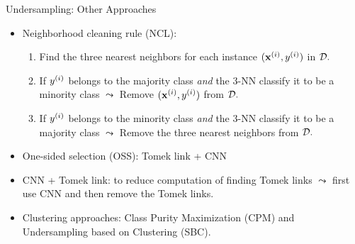 \documentclass[11pt,compress,t,notes=noshow, xcolor=table]{beamer}
\begin{document}
	\begin{frame}{Undersampling: Other Approaches}

		\footnotesize
		\begin{itemize}
	
			\item Neighborhood cleaning rule (NCL):
		
			\begin{enumerate} \footnotesize
				
				\item Find the three nearest neighbors for each instance $(\mathbf{x}^{(i)},y^{(i)})$ in $\mathcal{D}.$
                \vspace{5pt}
			
				\item If $y^{(i)}$ belongs to the majority class \emph{and} the 3-NN classify it to be a minority class $\leadsto$ Remove $(\mathbf{x}^{(i)},y^{(i)})$ from $\mathcal{D}.$
                \vspace{5pt}
			
				\item If $y^{(i)}$ belongs to the minority class \emph{and} the 3-NN classify it to be a majority class $\leadsto$ Remove the three nearest neighbors from $\mathcal{D}.$
                \vspace{5pt}
			
			\end{enumerate} 
            \vspace{10pt}
		
			\item One-sided selection (OSS): Tomek link + CNN
            \vspace{10pt}
	
			\item CNN + Tomek link: to reduce computation of finding Tomek links $\leadsto$ first use CNN and then remove the Tomek links.
            \vspace{10pt}
		
			\item Clustering approaches: Class Purity Maximization (CPM) and Undersampling based on Clustering (SBC).

		\end{itemize}

	\end{frame}
	
\end{document}
